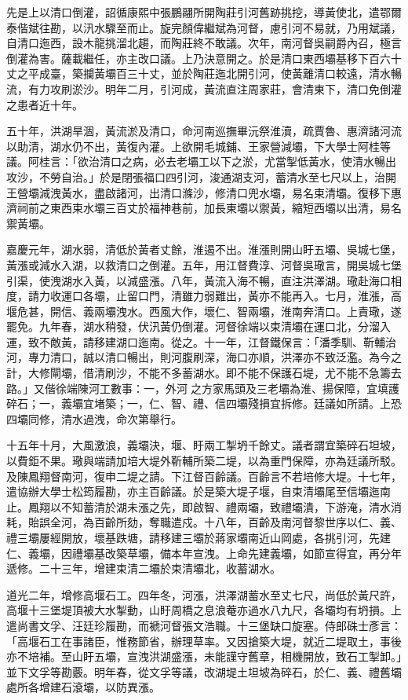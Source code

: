 \begin{pinyinscope}
先是上以清口倒灌，詔循康熙中張鵬翮所開陶莊引河舊跡挑挖，導黃使北，遣鄂爾泰偕斌往勘，以汛水驟至而止。旋完顏偉繼斌為河督，慮引河不易就，乃用斌議，自清口迤西，設木龍挑溜北趨，而陶莊終不敢議。次年，南河督吳嗣爵內召，極言倒灌為害。薩載繼任，亦主改口議。上乃決意開之。於是清口東西壩基移下百六十丈之平成臺，築攔黃壩百三十丈，並於陶莊迤北開引河，使黃離清口較遠，清水暢流，有力攻刷淤沙。明年二月，引河成，黃流直注周家莊，會清東下，清口免倒灌之患者近十年。

五十年，洪湖旱涸，黃流淤及清口，命河南巡撫畢沅祭淮瀆，疏賈魯、惠濟諸河流以助清，湖水仍不出，黃復內灌。上欲開毛城鋪、王家營減壩，下大學士阿桂等議。阿桂言：「欲治清口之病，必去老壩工以下之淤，尤當掣低黃水，使清水暢出攻沙，不勞自治。」於是閉張福口四引河，浚通湖支河，蓄清水至七尺以上，治開王營壩減洩黃水，盡啟諸河，出清口滌沙，修清口兜水壩，易名束清壩。復移下惠濟祠前之東西束水壩三百丈於福神巷前，加長東壩以禦黃，縮短西壩以出清，易名禦黃壩。

嘉慶元年，湖水弱，清低於黃者丈餘，淮遏不出。淮漲則開山盱五壩、吳城七堡，黃漲或減水入湖，以救清口之倒灌。五年，用江督費淳、河督吳璥言，開吳城七堡引渠，使洩湖水入黃，以減盛漲。八年，黃流入海不暢，直注洪澤湖。璥赴海口相度，請力收運口各壩，止留口門，清雖力弱難出，黃亦不能再入。七月，淮漲，高堰危甚，開信、義兩壩洩水。西風大作，壞仁、智兩壩，淮南奔清口。上責璥，遂罷免。九年春，湖水稍發，伏汛黃仍倒灌。河督徐端以束清壩在運口北，分溜入運，致不敵黃，請移建湖口迤南。從之。十一年，江督鐵保言：「潘季馴、靳輔治河，專力清口，誠以清口暢出，則河腹刷深，海口亦順，洪澤亦不致泛濫。為今之計，大修閘壩，借清刷沙，不能不多蓄湖水。即不能不保護石堤，尤不能不急籌去路。」又偕徐端陳河工數事：一，外河之方家馬頭及三老壩為淮、揚保障，宜填護碎石；一，義壩宜堵築；一，仁、智、禮、信四壩殘損宜拆修。廷議如所請。上恐四壩同修，清水過洩，命次第舉行。

十五年十月，大風激浪，義壩決，堰、盱兩工掣坍千餘丈。議者謂宜築碎石坦坡，以費鉅不果。璥與端請加培大堤外靳輔所築二堤，以為重門保障，亦為廷議所駁。及陳鳳翔督南河，復申二堤之請。下江督百齡議。百齡言不若培修大堤。十七年，遣協辦大學士松筠履勘，亦主百齡議。於是築大堤子堰，自束清壩尾至信壩迤南止。鳳翔以不知蓄清於湖未漲之先，即啟智、禮兩壩，致禮壩潰，下游淹，清水消耗，貽誤全河，為百齡所劾，奪職遣戍。十八年，百齡及南河督黎世序以仁、義、禮三壩屢經開放，壞基跌塘，請移建三壩於蔣家壩南近山岡處，各挑引河，先建仁、義壩，因禮壩基改築草壩，備本年宣洩。上命先建義壩，如節宣得宜，再分年遞修。二十三年，增建束清二壩於束清壩北，收蓄湖水。

道光二年，增修高堰石工。四年冬，河漲，洪澤湖蓄水至丈七尺，尚低於黃尺許，高堰十三堡堤頂被大水掣動，山盱周橋之息浪菴亦過水八九尺，各壩均有坍損。上遣尚書文孚、汪廷珍履勘，而褫河督張文浩職。十三堡缺口旋塞。侍郎硃士彥言：「高堰石工在事諸臣，惟務節省，辦理草率。又因搶築大堤，就近二堤取土，事後亦不培補。至山盱五壩，宣洩洪湖盛漲，未能謹守舊章，相機開放，致石工掣卸。」並下文孚等勘覈。明年春，從文孚等議，改湖堤土坦坡為碎石，於仁、義、禮舊壩處所各增建石滾壩，以防異漲。


\end{pinyinscope}
